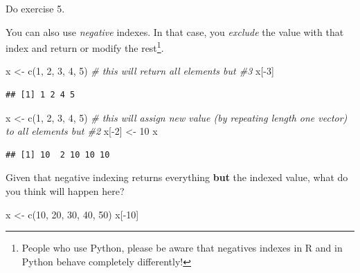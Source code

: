 \documentclass[
]{book}
\newenvironment{Shaded}{\begin{snugshade}}{\end{snugshade}}
\newcommand{\CommentTok}[1]{\textcolor[rgb]{0.56,0.35,0.01}{\textit{#1}}}
\newcommand{\DecValTok}[1]{\textcolor[rgb]{0.00,0.00,0.81}{#1}}
\newcommand{\FunctionTok}[1]{\textcolor[rgb]{0.00,0.00,0.00}{#1}}
\newcommand{\NormalTok}[1]{#1}
\newcommand{\OtherTok}[1]{\textcolor[rgb]{0.56,0.35,0.01}{#1}}
\newcommand{\SpecialCharTok}[1]{\textcolor[rgb]{0.00,0.00,0.00}{#1}}
\begin{document}
Do exercise 5.

You can also use \emph{negative} indexes. In that case, you \emph{exclude} the value with that index and return or modify the rest\footnote{People who use Python, please be aware that negatives indexes in R and in Python behave completely differently!}.

\begin{Shaded}
\begin{Highlighting}[]
\NormalTok{x }\OtherTok{\textless{}{-}} \FunctionTok{c}\NormalTok{(}\DecValTok{1}\NormalTok{, }\DecValTok{2}\NormalTok{, }\DecValTok{3}\NormalTok{, }\DecValTok{4}\NormalTok{, }\DecValTok{5}\NormalTok{)}
\CommentTok{\# this will return all elements but \#3}
\NormalTok{x[}\SpecialCharTok{{-}}\DecValTok{3}\NormalTok{] }
\end{Highlighting}
\end{Shaded}

\begin{verbatim}
## [1] 1 2 4 5
\end{verbatim}

\begin{Shaded}
\begin{Highlighting}[]
\NormalTok{x }\OtherTok{\textless{}{-}} \FunctionTok{c}\NormalTok{(}\DecValTok{1}\NormalTok{, }\DecValTok{2}\NormalTok{, }\DecValTok{3}\NormalTok{, }\DecValTok{4}\NormalTok{, }\DecValTok{5}\NormalTok{)}
\CommentTok{\# this will assign new value (by repeating length one vector) to all elements but \#2}
\NormalTok{x[}\SpecialCharTok{{-}}\DecValTok{2}\NormalTok{] }\OtherTok{\textless{}{-}} \DecValTok{10}
\NormalTok{x}
\end{Highlighting}
\end{Shaded}

\begin{verbatim}
## [1] 10  2 10 10 10
\end{verbatim}

Given that negative indexing returns everything \textbf{but} the indexed value, what do you think will happen here?

\begin{Shaded}
\begin{Highlighting}[]
\NormalTok{x }\OtherTok{\textless{}{-}} \FunctionTok{c}\NormalTok{(}\DecValTok{10}\NormalTok{, }\DecValTok{20}\NormalTok{, }\DecValTok{30}\NormalTok{, }\DecValTok{40}\NormalTok{, }\DecValTok{50}\NormalTok{)}
\NormalTok{x[}\SpecialCharTok{{-}}\DecValTok{10}\NormalTok{]}
\end{Highlighting}
\end{Shaded}
\end{document}
